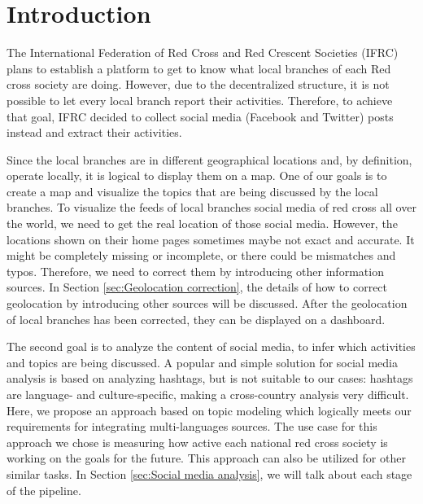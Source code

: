 \documentclass[sigchi]{acmart}
\begin{document}
\maketitle
\section{Introduction}
The International Federation of Red Cross and Red Crescent Societies (IFRC) plans to establish a platform to get to know what local branches of each Red cross society are doing. However, due to the decentralized structure, it is not possible to let every local branch report their activities. Therefore, to achieve that goal, IFRC decided to collect social media (Facebook and Twitter) posts instead and extract their activities. 

Since the local branches are in different geographical locations and, by definition, operate locally, it is logical to display them on a map. One of our goals is to create a map and visualize the topics that are being discussed by the local branches. To visualize the feeds of local branches social media of red cross all over the world, we need to get the real location of those social media. However, the locations shown on their home pages sometimes maybe not exact and accurate. It might be completely missing or incomplete, or there could be mismatches and typos. Therefore, we need to correct them by introducing other information sources. In Section \ref{sec:Geolocation correction}, the details of how to correct geolocation by introducing other sources will be discussed. After the geolocation of local branches has been corrected, they can be displayed on a dashboard.

The second goal is to analyze the content of social media, to infer which activities and topics are being discussed. A popular and simple solution for social media analysis is based on analyzing hashtags, but is not suitable to our cases: hashtags are language- and culture-specific, making a cross-country analysis very difficult. Here, we propose an approach based on topic modeling which logically meets our requirements for integrating multi-languages sources. The use case for this approach we chose is measuring how active each national red cross society is working on the goals for the future. This approach can also be utilized for other similar tasks. In Section \ref{sec:Social media analysis}, we will talk about each stage of the pipeline.
\end{document}
